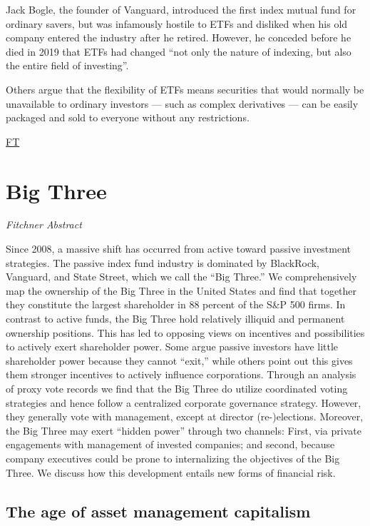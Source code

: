 \documentclass[
]{book}
\begin{document}
Jack Bogle, the founder of Vanguard, introduced the first index mutual fund for ordinary savers, but was infamously hostile to ETFs and disliked when his old company entered the industry after he retired. However, he conceded before he died in 2019 that ETFs had changed ``not only the nature of indexing, but also the entire field of investing''.

Others argue that the flexibility of ETFs means securities that would normally be unavailable to ordinary investors --- such as complex derivatives --- can be easily packaged and sold to everyone without any restrictions.

\href{https://www.ft.com/content/7d5c2468-619c-4c4b-b3e7-b0da015e939d}{FT}

\hypertarget{big-three}{%
\section{Big Three}\label{big-three}}

\emph{Fitchner Abstract}

Since 2008, a massive shift has occurred from active toward passive investment strategies. The passive index fund industry is dominated by BlackRock, Vanguard, and State Street, which we call the ``Big Three.'' We comprehensively map the ownership of the Big Three in the United States and find that together they constitute the largest shareholder in 88 percent of the S\&P 500 firms. In contrast to active funds, the Big Three hold relatively illiquid and permanent ownership positions. This has led to opposing views on incentives and possibilities to actively exert shareholder power. Some argue passive investors have little shareholder power because they cannot ``exit,'' while others point out this gives them stronger incentives to actively influence corporations. Through an analysis of proxy vote records we find that the Big Three do utilize coordinated voting strategies and hence follow a centralized corporate governance strategy. However, they generally vote with management, except at director (re-)elections. Moreover, the Big Three may exert ``hidden power'' through two channels: First, via private engagements with management of invested companies; and second, because company executives could be prone to internalizing the objectives of the Big Three. We discuss how this development entails new forms of financial risk.

\hypertarget{the-age-of-asset-management-capitalism}{%
\subsection{The age of asset management capitalism}\label{the-age-of-asset-management-capitalism}}
\end{document}
